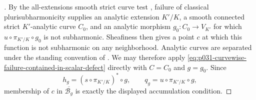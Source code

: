 \begin{proof}[]
By the all-extensions smooth strict curve test
\cite[Definition~4.1 and \S4.1.3]{GR25Classical}, failure of classical
plurisubharmonicity supplies an analytic extension $K'/K$, a smooth
connected strict $K'$-analytic curve $C_0$, and an analytic morphism
$g_0:C_0\to V_{K'}$ for which $u\circ\pi_{K'/K}\circ g_0$ is not
subharmonic.  Sheafiness then gives a point $c$ at which this function is
not subharmonic on any neighborhood.  Analytic curves are separated under
the standing convention of \cite[\S3.1]{GR25Classical}.  We may therefore
apply \eqref{eq:p031-curvewise-failure-contained-in-scalar-defect} directly
with $C=C_0$ and $g=g_0$.  Since
\[
 h_g=(s\circ\pi_{K'/K})^*\circ g,
 \qquad
 q_g=u\circ\pi_{K'/K}\circ g,
\]
membership of $c$ in $\overline{\mathcal B_g}$ is exactly the displayed
accumulation condition.
\end{proof}
